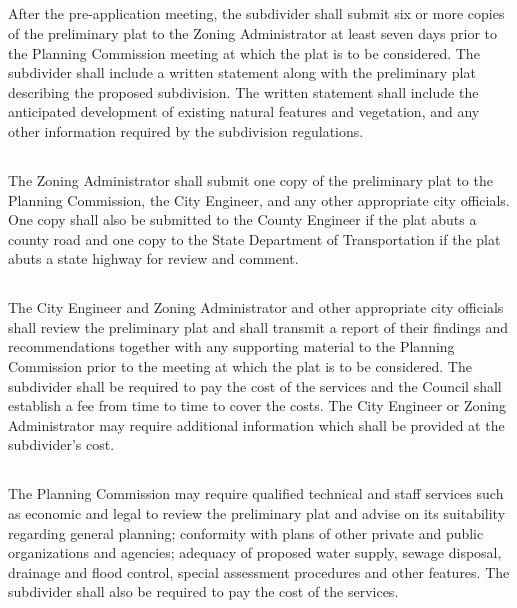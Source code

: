 \subsection{}
After the pre-application meeting, the subdivider shall submit six or more copies of the preliminary plat to the Zoning Administrator at least seven days prior to the Planning Commission meeting at which the plat is to be considered. The subdivider shall include a written statement along with the preliminary plat describing the proposed subdivision. The written statement shall include the anticipated development of existing natural features and vegetation, and any other information required by the subdivision regulations.
\subsection{}
The Zoning Administrator shall submit one copy of the preliminary plat to the Planning Commission, the City Engineer, and any other appropriate city officials. One copy shall also be submitted to the County Engineer if the plat abuts a county road and one copy to the State Department of Transportation if the plat abuts a state highway for review and comment.
\subsection{}
The City Engineer and Zoning Administrator and other appropriate city officials shall review the preliminary plat and shall transmit a report of their findings and recommendations together with any supporting material to the Planning Commission prior to the meeting at which the plat is to be considered. The subdivider shall be required to pay the cost of the services and the Council shall establish a fee from time to time to cover the costs. The City Engineer or Zoning Administrator may require additional information which shall be provided at the subdivider’s cost.
\subsection{}
The Planning Commission may require qualified technical and staff services such as economic and legal to review the preliminary plat and advise on its suitability regarding general planning; conformity with plans of other private and public organizations and agencies; adequacy of proposed water supply, sewage disposal, drainage and flood control, special assessment procedures and other features. The subdivider shall also be required to pay the cost of the services.
